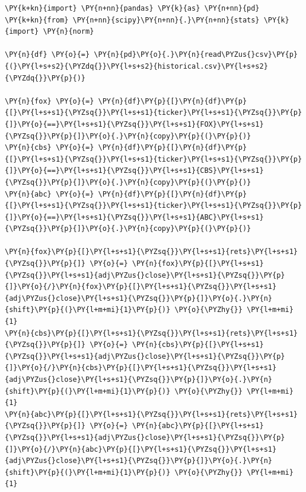 \begin{Answer}
\begin{tcolorbox}[size=fbox, boxrule=1pt, colback=cellbackground, colframe=cellborder]
\begin{Verbatim}[commandchars=\\\{\}]
\PY{k+kn}{import} \PY{n+nn}{pandas} \PY{k}{as} \PY{n+nn}{pd}
\PY{k+kn}{from} \PY{n+nn}{scipy}\PY{n+nn}{.}\PY{n+nn}{stats} \PY{k}{import} \PY{n}{norm}
		
\PY{n}{df} \PY{o}{=} \PY{n}{pd}\PY{o}{.}\PY{n}{read\PYZus{}csv}\PY{p}{(}\PY{l+s+s2}{\PYZdq{}}\PY{l+s+s2}{historical.csv}\PY{l+s+s2}{\PYZdq{}}\PY{p}{)}
		
\PY{n}{fox} \PY{o}{=} \PY{n}{df}\PY{p}{[}\PY{n}{df}\PY{p}{[}\PY{l+s+s1}{\PYZsq{}}\PY{l+s+s1}{ticker}\PY{l+s+s1}{\PYZsq{}}\PY{p}{]}\PY{o}{==}\PY{l+s+s1}{\PYZsq{}}\PY{l+s+s1}{FOX}\PY{l+s+s1}{\PYZsq{}}\PY{p}{]}\PY{o}{.}\PY{n}{copy}\PY{p}{(}\PY{p}{)}
\PY{n}{cbs} \PY{o}{=} \PY{n}{df}\PY{p}{[}\PY{n}{df}\PY{p}{[}\PY{l+s+s1}{\PYZsq{}}\PY{l+s+s1}{ticker}\PY{l+s+s1}{\PYZsq{}}\PY{p}{]}\PY{o}{==}\PY{l+s+s1}{\PYZsq{}}\PY{l+s+s1}{CBS}\PY{l+s+s1}{\PYZsq{}}\PY{p}{]}\PY{o}{.}\PY{n}{copy}\PY{p}{(}\PY{p}{)}
\PY{n}{abc} \PY{o}{=} \PY{n}{df}\PY{p}{[}\PY{n}{df}\PY{p}{[}\PY{l+s+s1}{\PYZsq{}}\PY{l+s+s1}{ticker}\PY{l+s+s1}{\PYZsq{}}\PY{p}{]}\PY{o}{==}\PY{l+s+s1}{\PYZsq{}}\PY{l+s+s1}{ABC}\PY{l+s+s1}{\PYZsq{}}\PY{p}{]}\PY{o}{.}\PY{n}{copy}\PY{p}{(}\PY{p}{)}
		
\PY{n}{fox}\PY{p}{[}\PY{l+s+s1}{\PYZsq{}}\PY{l+s+s1}{rets}\PY{l+s+s1}{\PYZsq{}}\PY{p}{]} \PY{o}{=} \PY{n}{fox}\PY{p}{[}\PY{l+s+s1}{\PYZsq{}}\PY{l+s+s1}{adj\PYZus{}close}\PY{l+s+s1}{\PYZsq{}}\PY{p}{]}\PY{o}{/}\PY{n}{fox}\PY{p}{[}\PY{l+s+s1}{\PYZsq{}}\PY{l+s+s1}{adj\PYZus{}close}\PY{l+s+s1}{\PYZsq{}}\PY{p}{]}\PY{o}{.}\PY{n}{shift}\PY{p}{(}\PY{l+m+mi}{1}\PY{p}{)} \PY{o}{\PYZhy{}} \PY{l+m+mi}{1} 
\PY{n}{cbs}\PY{p}{[}\PY{l+s+s1}{\PYZsq{}}\PY{l+s+s1}{rets}\PY{l+s+s1}{\PYZsq{}}\PY{p}{]} \PY{o}{=} \PY{n}{cbs}\PY{p}{[}\PY{l+s+s1}{\PYZsq{}}\PY{l+s+s1}{adj\PYZus{}close}\PY{l+s+s1}{\PYZsq{}}\PY{p}{]}\PY{o}{/}\PY{n}{cbs}\PY{p}{[}\PY{l+s+s1}{\PYZsq{}}\PY{l+s+s1}{adj\PYZus{}close}\PY{l+s+s1}{\PYZsq{}}\PY{p}{]}\PY{o}{.}\PY{n}{shift}\PY{p}{(}\PY{l+m+mi}{1}\PY{p}{)} \PY{o}{\PYZhy{}} \PY{l+m+mi}{1} 
\PY{n}{abc}\PY{p}{[}\PY{l+s+s1}{\PYZsq{}}\PY{l+s+s1}{rets}\PY{l+s+s1}{\PYZsq{}}\PY{p}{]} \PY{o}{=} \PY{n}{abc}\PY{p}{[}\PY{l+s+s1}{\PYZsq{}}\PY{l+s+s1}{adj\PYZus{}close}\PY{l+s+s1}{\PYZsq{}}\PY{p}{]}\PY{o}{/}\PY{n}{abc}\PY{p}{[}\PY{l+s+s1}{\PYZsq{}}\PY{l+s+s1}{adj\PYZus{}close}\PY{l+s+s1}{\PYZsq{}}\PY{p}{]}\PY{o}{.}\PY{n}{shift}\PY{p}{(}\PY{l+m+mi}{1}\PY{p}{)} \PY{o}{\PYZhy{}} \PY{l+m+mi}{1} 
		

\end{Verbatim}
\end{tcolorbox}
\end{Answer}
